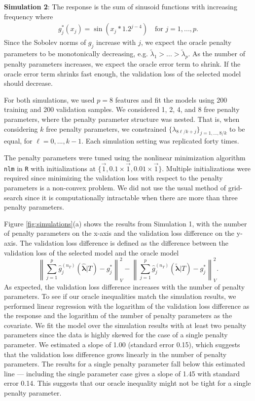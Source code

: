 \documentclass[12pt]{article} %
\theoremstyle{definition}
\begin{document}
\textbf{Simulation 2}: The response is the sum of sinusoid functions with increasing frequency where
\begin{align}
g_j^*(x_j) = \sin(x_j * 1.2^{j - 4}) \quad \text{for } j = 1,...,p.
\label{eq:sim2}
\end{align}
Since the Sobolev norms of $g_j$ increase with $j$, we expect the oracle penalty parameters to be monotonically decreasing, e.g. $\tilde{\lambda}_1 > ... > \tilde{\lambda}_p$. 
As the number of penalty parameters increases, we expect the oracle error term to shrink. If the oracle error term shrinks fast enough, the validation loss of the selected model should decrease.

For both simulations, we used $p = 8$ features and fit the models using 200 training and 200 validation samples. We considered 1, 2, 4, and 8 free penalty parameters, where the penalty parameter structure was nested. That is, when considering $k$ free penalty parameters, we constrained $\{\lambda_{8\ell/k + j} \}_{j = 1,...,8/k}$ to be equal, for $\ell= 0,...,k - 1$. Each simulation setting was replicated forty times.

The penalty parameters were tuned using the nonlinear minimization algorithm \texttt{nlm} in \texttt{R} with initializations at $\{\vec{1}, 0.1 \times \vec{1}, 0.01 \times \vec{1}\}$. 
Multiple initializations were required since minimizing the validation loss with respect to the penalty parameters is a non-convex problem.
We did not use the usual method of grid-search since it is computationally intractable when there are more than three penalty parameters.

Figure \ref{fig:simulations}(a) shows the results from Simulation 1, with the number of penalty parameters on the x-axis and the validation loss difference on the y-axis. The validation loss difference is defined as the difference between the validation loss of the selected model and the oracle model
$$
\left \| \sum_{j=1}^p \hat{g}^{(n_T)}_j(\hat{\boldsymbol{\lambda}}|T) - g^*_j \right \|_V^2 - 
\left \| \sum_{j=1}^p \hat{g}^{(n_T)}_j(\tilde{\boldsymbol{\lambda}} | T) - g^*_j \right \|_V^2.
$$
As expected, the validation loss difference increases with the number of penalty parameters.
To see if our oracle inequalities match the simulation results, we performed linear regression with the logarithm of the validation loss difference as the response and the logarithm of the number of penalty parameters as the covariate. 
We fit the model over the simulation results with at least two penalty parameters since the data is highly skewed for the case of a single penalty parameter. 
We estimated a slope of 1.00 (standard error 0.15), which suggests that the validation loss difference grows linearly in the number of penalty parameters. 
The results for a single penalty parameter fall below this estimated line --- including the single parameter case gives a slope of 1.45 with standard error 0.14.
This suggests that our oracle inequality might not be tight for a single penalty parameter.
\end{document}
